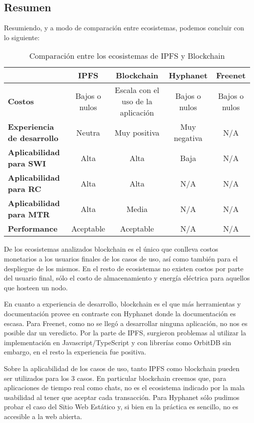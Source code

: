 \subsection{Resumen}

Resumiendo, y a modo de comparación entre ecosistemas, podemos concluir con lo siguiente:

\setlength\tabcolsep{2pt}
\begin{table}[H]
    \centering
    \begin{tabular}{|m{7em}|c|c|c|c|}
    \hline
      & \textbf{IPFS} & \textbf{Blockchain} & \textbf{Hyphanet} & \textbf{Freenet} \\
    \hline
    \textbf{Costos} & Bajos o nulos & Escala con el uso de la aplicación & Bajos o nulos & Bajos o nulos \\
    \hline
    \textbf{Experiencia de desarrollo} & Neutra & Muy positiva & Muy negativa & N/A \\
    \hline
    \textbf{Aplicabilidad para SWI} & Alta & Alta & Baja & N/A \\
    \hline
    \textbf{Aplicabilidad para RC} & Alta & Alta & N/A & N/A \\
    \hline
    \textbf{Aplicabilidad para MTR} & Alta & Media & N/A & N/A \\
    \hline
    \textbf{Performance} & Aceptable & Aceptable & N/A & N/A \\
    \hline
    \end{tabular}
    \caption{Comparación entre los ecosistemas de IPFS y Blockchain}
\end{table}

De los ecosistemas analizados blockchain es el único que conlleva costos monetarios a los usuarios finales de los casos de uso, así como también para el despliegue de los mismos. En el resto de ecosistemas no existen costos por parte del usuario final, sólo el costo de almacenamiento y energía eléctrica para aquellos que hosteen un nodo.

En cuanto a experiencia de desarrollo, blockchain es el que más herramientas y documentación provee en contraste con Hyphanet donde la documentación es escasa. Para Freenet, como no se llegó a desarrollar ninguna aplicación, no nos es posible dar un veredicto. Por la parte de IPFS, surgieron problemas al utilizar la implementación en Javascript/TypeScript y con librerías como OrbitDB sin embargo, en el resto la experiencia fue positiva.

Sobre la aplicabilidad de los casos de uso, tanto IPFS como blockchain pueden ser utilizados para los 3 casos. En particular blockchain creemos que, para aplicaciones de tiempo real como chats, no es el ecosistema indicado por la mala usabilidad al tener que aceptar cada transacción. Para Hyphanet sólo pudimos probar el caso del Sitio Web Estático y, si bien en la práctica es sencillo, no es accesible a la web abierta.

